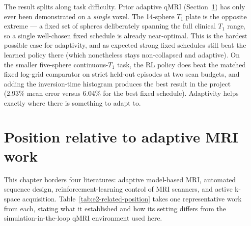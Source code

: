 The result splits along task difficulty. Prior adaptive qMRI
(Section~\ref{sec:e2-related-position}) has only ever been demonstrated on a
\emph{single} voxel. The 14-sphere $T_1$ plate is the opposite extreme --- a
fixed set of spheres deliberately spanning the full clinical $T_1$ range, so a single well-chosen fixed schedule
is already near-optimal. This is the hardest possible case for adaptivity, and
as expected strong fixed schedules still beat the learned policy there (which
nonetheless stays non-collapsed and adaptive). On the smaller five-sphere
continuous-$T_1$ task, the
RL policy does beat the matched fixed log-grid comparator on strict held-out
episodes at two scan budgets, and adding the inversion-time histogram produces
the best result in the project (2.93\% mean error versus 6.04\% for the best
fixed schedule). Adaptivity helps exactly where there is something to adapt to.

\section{Position relative to adaptive MRI work}
\label{sec:e2-related-position}

This chapter borders four literatures: adaptive model-based MRI,
automated sequence design, reinforcement-learning control of MRI scanners,
and active k-space acquisition. Table~\ref{tab:e2-related-position} takes one
representative work from each, stating what it established and how its setting
differs from the simulation-in-the-loop qMRI environment used here.

